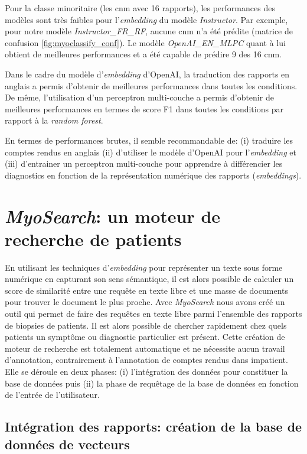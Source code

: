 Pour la classe minoritaire (les \gls{cnm} avec 16 rapports), les performances des modèles sont très faibles pour l'\textit{embedding} du modèle \textit{Instructor}. Par exemple, pour notre modèle \textit{Instructor\_FR\_RF}, aucune \gls{cnm} n'a été prédite (matrice de confusion \ref{fig:myoclassify_conf}). Le modèle \textit{OpenAI\_EN\_MLPC} quant à lui obtient de meilleures performances et a été capable de prédire 9 des 16 \gls{cnm}. 

Dans le cadre du modèle d'\textit{embedding} d'OpenAI, la traduction des rapports en anglais a permis d'obtenir de meilleures performances dans toutes les conditions. De même, l'utilisation d'un perceptron multi-couche a permis d'obtenir de meilleures performances en termes de score F1 dans toutes les conditions par rapport à la \textit{random forest}.

En termes de performances brutes, il semble recommandable de: (i) traduire les comptes rendus en anglais (ii) d'utiliser le modèle d'OpenAI pour l'\textit{embedding} et (iii) d'entrainer un perceptron multi-couche pour apprendre à différencier les diagnostics en fonction de la représentation numérique des rapports (\textit{embeddings}).

\section{\textit{MyoSearch}: un moteur de recherche de patients}
En utilisant les techniques d'\textit{embedding} pour représenter un texte sous forme numérique en capturant son sens sémantique, il est alors possible de calculer un score de similarité entre une requête en texte libre et une masse de documents pour trouver le document le plus proche. Avec \textit{MyoSearch} nous avons créé un outil qui permet de faire des requêtes en texte libre parmi l'ensemble des rapports de biopsies de patients. Il est alors possible de chercher rapidement chez quels patients un symptôme ou diagnostic particulier est présent. Cette création de moteur de recherche est totalement automatique et ne nécessite aucun travail d'annotation, contrairement à l'annotation de comptes rendus dans \gls{impatient}. Elle se déroule en deux phases: (i) l'intégration des données pour constituer la base de données puis (ii) la phase de requêtage de la base de données en fonction de l'entrée de l'utilisateur.

\subsection{Intégration des rapports: création de la base de données de vecteurs}

